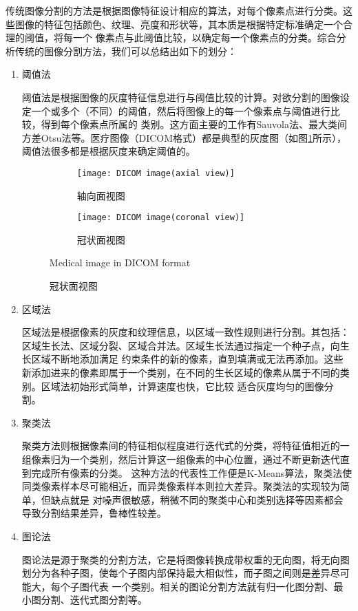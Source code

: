 	传统图像分割的方法是根据图像特征设计相应的算法，对每个像素点进行分类。这些图像的特征包括颜色、纹理、亮度和形状等，其本质是根据特定标准确定一个合理的阈值，将每一个
	像素点与此阈值比较，以确定每一个像素点的分类。综合分析传统的图像分割方法，我们可以总结出如下的划分：
	\begin{enumerate}
		\item 阈值法
		
		阈值法是根据图像的灰度特征信息进行与阈值比较的计算。对欲分割的图像设定一个或多个（不同）的阈值，然后将图像上的每一个像素点与阈值进行比较，得到每个像素点所属的
		类别。这方面主要的工作有Sauvola法\cite{sauvola2000adaptive}、最大类间方差Otsu法\cite{otsu1979threshold}等。医疗图像（DICOM格式\cite{mustra2008overview}）都是典型的灰度图（如图\ref{fig:medical_image}所示），阈值法很多都是根据灰度来确定阈值的。
		\begin{figure}[!htp]
			\centering
			\begin{subfigure}{0.45\textwidth}
				\centering
				\texttt{[image: DICOM image(axial view)]}
				\caption{轴向面视图}
			\end{subfigure}
			\hfill
			\begin{subfigure}{0.45\textwidth}
				\centering
				\texttt{[image: DICOM image(coronal view)]}
				\caption{冠状面视图}
			\end{subfigure}
				{Medical image in DICOM format}
			\label{fig:medical_image}
		\end{figure}
		
		\item 区域法
		
		区域法是根据像素的灰度和纹理信息，以区域一致性规则进行分割。其包括：区域生长法、区域分裂、区域合并法。区域生长法通过指定一个种子点，向生长区域不断地添加满足
		约束条件的新的像素，直到填满或无法再添加。这些新添加进来的像素即属于一个类别，在不同的生长区域的像素从属于不同的类别。区域法初始形式简单，计算速度也快，它比较
		适合灰度均匀的图像分割。
		
		\item 聚类法
		
		聚类方法则根据像素间的特征相似程度进行迭代式的分类，将特征值相近的一组像素归为一个类别，然后计算这一组像素的中心位置，通过不断更新迭代直到完成所有像素的分类。
		这种方法的代表性工作便是K-Means算法\cite{macqueen1965some}，聚类法使同类像素样本尽可能相近，而异类像素样本则拉大差异。聚类法的实现较为简单，但缺点就是
		对噪声很敏感，稍微不同的聚类中心和类别选择等因素都会导致分割结果差异，鲁棒性较差。
		
		\item 图论法
		
		图论法是源于聚类的分割方法，它是将图像转换成带权重的无向图，将无向图划分为各种子图，使每个子图内部保持最大相似性，而子图之间则是差异尽可能大，每个子图代表
		一个类别。相关的图论分割方法就有归一化图分割、最小图分割、迭代式图分割等。
	\end{enumerate}
	

